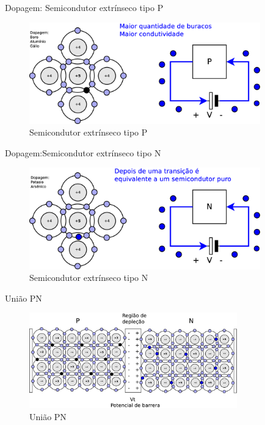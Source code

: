 \documentclass[envcountsect,dvips]{beamer}
\begin{document}
\begin{frame}{Dopagem: Semicondutor extrínseco tipo P}
\begin{figure}
\centering
\includegraphics[width=10cm]{images/extrinsecop.eps}
\caption{Semicondutor extrínseco tipo P}
\label{fig:semip}
\end{figure}
\end{frame}

\begin{frame}{Dopagem:Semicondutor extrínseco tipo N}
\begin{figure}
\centering
\includegraphics[width=10cm]{images/extrinsecon.eps}
\caption{Semicondutor extrínseco tipo N}
\label{fig:semin}
\end{figure}
\end{frame}

\begin{frame}{União PN  }
\begin{figure}
\centering
\includegraphics[width=9cm]{images/semipn0.eps}
\caption{União PN  }
\label{fig:semipn0}
\end{figure}
\end{frame}
\end{document}
